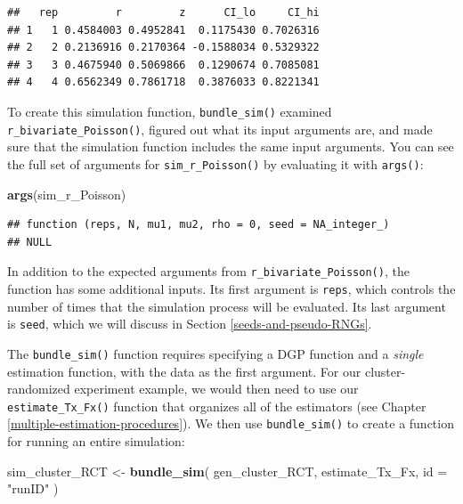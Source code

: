 \documentclass[
]{book}
\newenvironment{Shaded}{\begin{snugshade}}{\end{snugshade}}
\newcommand{\AttributeTok}[1]{\textcolor[rgb]{0.13,0.29,0.53}{#1}}
\newcommand{\FunctionTok}[1]{\textcolor[rgb]{0.13,0.29,0.53}{\textbf{#1}}}
\newcommand{\NormalTok}[1]{#1}
\newcommand{\OtherTok}[1]{\textcolor[rgb]{0.56,0.35,0.01}{#1}}
\newcommand{\StringTok}[1]{\textcolor[rgb]{0.31,0.60,0.02}{#1}}
\begin{document}
\begin{verbatim}
##   rep         r         z      CI_lo     CI_hi
## 1   1 0.4584003 0.4952841  0.1175430 0.7026316
## 2   2 0.2136916 0.2170364 -0.1588034 0.5329322
## 3   3 0.4675940 0.5069866  0.1290674 0.7085081
## 4   4 0.6562349 0.7861718  0.3876033 0.8221341
\end{verbatim}

To create this simulation function, \texttt{bundle\_sim()} examined \texttt{r\_bivariate\_Poisson()}, figured out what its input arguments are, and made sure that the simulation function includes the same input arguments.
You can see the full set of arguments for \texttt{sim\_r\_Poisson()} by evaluating it with \texttt{args()}:

\begin{Shaded}
\begin{Highlighting}[]
\FunctionTok{args}\NormalTok{(sim\_r\_Poisson)}
\end{Highlighting}
\end{Shaded}

\begin{verbatim}
## function (reps, N, mu1, mu2, rho = 0, seed = NA_integer_) 
## NULL
\end{verbatim}

In addition to the expected arguments from \texttt{r\_bivariate\_Poisson()}, the function has some additional inputs.
Its first argument is \texttt{reps}, which controls the number of times that the simulation process will be evaluated.
Its last argument is \texttt{seed}, which we will discuss in Section \ref{seeds-and-pseudo-RNGs}.

The \texttt{bundle\_sim()} function requires specifying a DGP function and a \emph{single} estimation function, with the data as the first argument.
For our cluster-randomized experiment example, we would then need to use our \texttt{estimate\_Tx\_Fx()} function that organizes all of the estimators (see Chapter \ref{multiple-estimation-procedures}).
We then use \texttt{bundle\_sim()} to create a function for running an entire simulation:

\begin{Shaded}
\begin{Highlighting}[]
\NormalTok{sim\_cluster\_RCT }\OtherTok{\textless{}{-}} \FunctionTok{bundle\_sim}\NormalTok{( gen\_cluster\_RCT, estimate\_Tx\_Fx, }\AttributeTok{id =} \StringTok{"runID"}\NormalTok{ )}
\end{Highlighting}
\end{Shaded}
\end{document}
